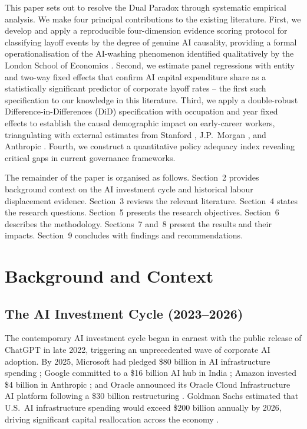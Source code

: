 \documentclass[12pt, a4paper]{article}
\begin{document}
This paper sets out to resolve the Dual Paradox through systematic empirical analysis. We
make four principal contributions to the existing literature. First, we develop and apply a
reproducible four-dimension evidence scoring protocol for classifying layoff events by the
degree of genuine AI causality, providing a formal operationalisation of the AI-washing
phenomenon identified qualitatively by the London School of Economics \citep{lse2025}.
Second, we estimate panel regressions with entity and two-way fixed effects that confirm
AI capital expenditure share as a statistically significant predictor of corporate layoff
rates -- the first such specification to our knowledge in this literature. Third, we apply
a double-robust Difference-in-Differences (DiD) specification with occupation and year fixed
effects to establish the causal demographic impact on early-career workers, triangulating
with external estimates from Stanford \citep{brynjolfsson2025}, J.P.~Morgan
\citep{jpmorgan2025}, and Anthropic \citep{anthropic2026}. Fourth, we construct a
quantitative policy adequacy index revealing critical gaps in current governance frameworks.

The remainder of the paper is organised as follows. Section~2 provides background context on
the AI investment cycle and historical labour displacement evidence. Section~3 reviews the
relevant literature. Section~4 states the research questions. Section~5 presents the research
objectives. Section~6 describes the methodology. Sections~7 and~8 present the results and
their impacts. Section~9 concludes with findings and recommendations.

\section{Background and Context}

\subsection{The AI Investment Cycle (2023--2026)}

The contemporary AI investment cycle began in earnest with the public release of ChatGPT in
late 2022, triggering an unprecedented wave of corporate AI adoption. By 2025, Microsoft had
pledged \$80 billion in AI infrastructure spending \citep{microsoft2025}; Google committed
to a \$16 billion AI hub in India \citep{google2025}; Amazon invested \$4 billion in
Anthropic \citep{amazon2025}; and Oracle announced its Oracle Cloud Infrastructure AI
platform following a \$30 billion restructuring \citep{oracle2025}. Goldman Sachs estimated
that U.S.\ AI infrastructure spending would exceed \$200 billion annually by 2026, driving
significant capital reallocation across the economy \citep{goldmansachs2025}.
\end{document}
